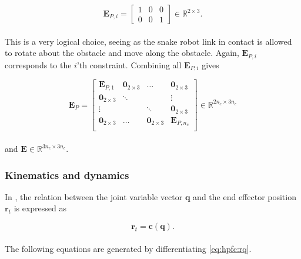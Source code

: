 \begin{equation}\label{eq:dhpfc_EPi}
    \mathbf{E}_{P,i} = 
    \begin{bmatrix}
        1 & 0 & 0 \\
        0 & 0 & 1
    \end{bmatrix} \in \mathbb{R}^{2\times 3}.
\end{equation}
\\
This is a very logical choice, seeing as the snake robot link in contact is allowed to rotate about the obstacle and move along the obstacle.
Again, $\mathbf{E}_{P,i}$ corresponds to the $i$'th constraint. Combining all $\mathbf{E}_{P,i}$ gives 

\begin{equation}
    \mathbf{E}_P = 
    \begin{bmatrix}
        \mathbf{E}_{P,1} & \mathbf{0}_{2\times3} & \dots & \mathbf{0}_{2\times3} \\
        \mathbf{0}_{2\times3} & \ddots & & \vdots \\
        \vdots & & \ddots & \mathbf{0}_{2\times3} \\
        \mathbf{0}_{2\times3} & \dots & \mathbf{0}_{2\times3} & \mathbf{E}_{P,n_c} \\
    \end{bmatrix} \in \mathbb{R}^{2 n_c \times 3 n_c}
\end{equation}
\\
and $\mathbf{E} \in \mathbb{R}^{3 n_c \times 3 n_c}$.


\subsubsection{Kinematics and dynamics}

In \cite{yoshikawa1987dynamic}, the relation between the joint variable vector $\mathbf{q}$ and the end effector position $\mathbf{r}_t$ is expressed as

\begin{equation}\label{eq:hpfc:rq}
    \mathbf{r}_t = \mathbf{c(q)}.
\end{equation}
\\
The following equations are generated by differentiating \ref{eq:hpfc:rq}.

